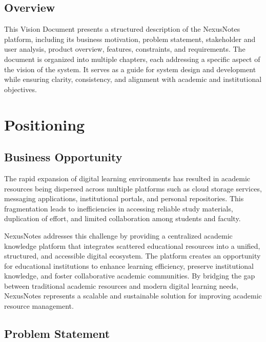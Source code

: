 \documentclass[12pt,a4paper]{report}
\begin{document}
\section{Overview}
This Vision Document presents a structured description of the NexusNotes platform, including its business motivation, problem statement, stakeholder and user analysis, product overview, features, constraints, and requirements. The document is organized into multiple chapters, each addressing a specific aspect of the vision of the system. It serves as a guide for system design and development while ensuring clarity, consistency, and alignment with academic and institutional objectives.

\chapter{Positioning}

\section{Business Opportunity}
The rapid expansion of digital learning environments has resulted in academic resources being dispersed across multiple platforms such as cloud storage services, messaging applications, institutional portals, and personal repositories. This fragmentation leads to inefficiencies in accessing reliable study materials, duplication of effort, and limited collaboration among students and faculty.

NexusNotes addresses this challenge by providing a centralized academic knowledge platform that integrates scattered educational resources into a unified, structured, and accessible digital ecosystem. The platform creates an opportunity for educational institutions to enhance learning efficiency, preserve institutional knowledge, and foster collaborative academic communities. By bridging the gap between traditional academic resources and modern digital learning needs, NexusNotes represents a scalable and sustainable solution for improving academic resource management.

\section{Problem Statement}
\end{document}
